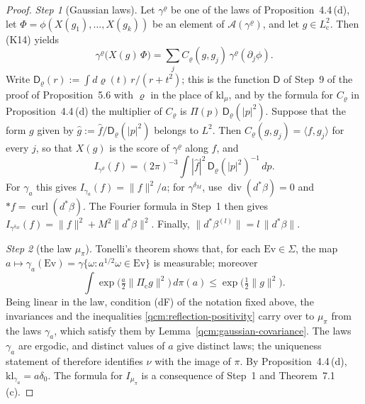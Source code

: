 \documentclass[11pt,letterpaper,reqno]{amsart}
\theoremstyle{definition}
\begin{document}
\begin{proof}
\emph{Step 1} (Gaussian laws).
Let $\gamma^\varrho$ be one of the laws of Proposition~4.4\,(d), let $\Phi=\phi(X(g_1),\dots,X(g_k))$ be an element of $\mathcal A(\gamma^\varrho)$, and let $g\in L^2_{\mathrm c}$.
Then (K14) yields
\begin{equation*}
\gamma^\varrho\bigl(X(g)\,\Phi\bigr)=\sum_jC_\varrho(g,g_j)\,\gamma^\varrho(\partial_j\phi).
\end{equation*}
Write $\mathsf D_\varrho(r):=\int d\varrho(t)\,r/(r+t^2)$;
this is the function $\mathsf D$ of Step~9 of the proof of Proposition~5.6 with $\varrho$ in the place of $\mathrm{kl}_\mu$,
and by the formula for $C_\varrho$ in Proposition~4.4\,(d) the multiplier of $C_\varrho$ is $\Pi(p)\,\mathsf D_\varrho(|p|^2)$.
Suppose that the form $g$ given by $\hat g:=\hat f/\mathsf D_\varrho(|p|^2)$ belongs to $L^2$.
Then $C_\varrho(g,g_j)=\langle f,g_j\rangle$ for every $j$,
so that $X(g)$ is the score of $\gamma^\varrho$ along $f$, and
\begin{equation*}
I_{\gamma^\varrho}(f)=(2\pi)^{-3}\int|\hat f|^2\,\mathsf D_\varrho(|p|^2)^{-1}\,dp.
\end{equation*}
For $\gamma_a$ this gives $I_{\gamma_a}(f)=\|f\|^2/a$;
for $\gamma^{\delta_M}$, use $\operatorname{div}(d^*\beta)=0$ and $\ast f=\operatorname{curl}(d^*\beta)$.
The Fourier formula in Step~1 then gives $I_{\gamma^{\delta_M}}(f)=\|f\|^2+M^2\|d^*\beta\|^2$.
Finally, $\|d^*\beta^{(l)}\|=l\,\|d^*\beta\|$.

\emph{Step 2} (the law $\mu_\pi$).
Tonelli's theorem shows that, for each $\mathrm{Ev}\in\Sigma$, the map $a\mapsto\gamma_a(\mathrm{Ev})=\allowbreak \gamma\{\omega:a^{1/2}\omega\in\mathrm{Ev}\}$ is measurable;
moreover
\begin{equation*}
\int\exp\bigl(\tfrac a2\|\Pi_{\mathrm c}g\|^2\bigr)\,d\pi(a)\le\exp\bigl(\tfrac12\|g\|^2\bigr).
\end{equation*}
Being linear in the law, condition (dF) of the notation fixed above, the invariances and the inequalities \eqref{qcm:reflection-positivity} carry over to $\mu_\pi$ from the laws $\gamma_a$, which satisfy them by Lemma~\ref{qcm:gaussian-covariance}.
The laws $\gamma_a$ are ergodic,
and distinct values of $a$ give distinct laws;
the uniqueness statement of \cite[Theorem~A and Section~5]{ErgodicComponents} therefore identifies $\nu$ with the image of $\pi$.
By Proposition~4.4\,(d), $\mathrm{kl}_{\gamma_a}=a\delta_0$.
The formula for $I_{\mu_\pi}$ is a consequence of Step~1 and Theorem~7.1\,(c).


\end{proof}
\end{document}
